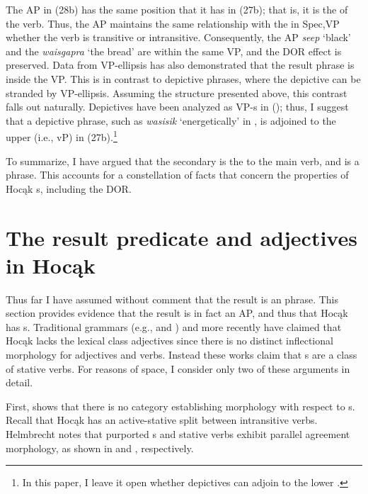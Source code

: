 \documentclass[output=paper]{LSP/langsci}
\begin{document}
The AP in (28b) has the same position that it has in (27b); that is, it is the  of the verb. Thus, the AP maintains the same relationship with the  in Spec,VP whether the verb is transitive or intransitive. Consequently, the AP \textit{seep} `black' and the  \textit{waisgapra} `the bread' are within the same VP, and the DOR effect is preserved. Data from VP-ellipsis has also demonstrated that the result phrase is inside the VP. This is in contrast to depictive phrases, where the depictive can be stranded by VP-ellipsis. Assuming the structure presented above, this contrast falls out naturally. Depictives have been analyzed as VP-s in  (\citealt{LevinRappaportHovav1995}); thus, I suggest that a depictive phrase, such as \textit{wasisik} `energetically' in , is adjoined to the upper  (i.e., vP) in (27b).\footnote{In this paper, I leave it open whether depictives can adjoin to the lower .}

 
To summarize, I have argued that the  secondary  is the  to the main verb, and is a phrase. This accounts for a constellation of facts that concern the properties of Hocąk s, including the DOR.
 

\section{The result  {predicate} and  {adjective}s in  Hocąk} \label{sec:rosen:5}

 
Thus far I have assumed without comment that the result  is an  phrase. This section provides evidence that the result is in fact an AP, and thus that Hocąk has s. Traditional grammars (e.g., \citealt{Lipkind1945} and \citealt{Susman1943}) and more recently \citet{Helmbrecht2006b} have claimed that Hocąk lacks the lexical class adjectives since there is no distinct inflectional morphology for adjectives and verbs. Instead these works claim that s are a class of stative verbs. For reasons of space, I consider only two of these arguments in detail.

First, \citet{Helmbrecht2006b} shows that there is no category establishing morphology with respect to s. Recall that Hocąk has an active-stative split between intransitive verbs. Helmbrecht notes that purported s and stative verbs exhibit parallel agreement morphology, as shown in  and , respectively.
 
\end{document}
